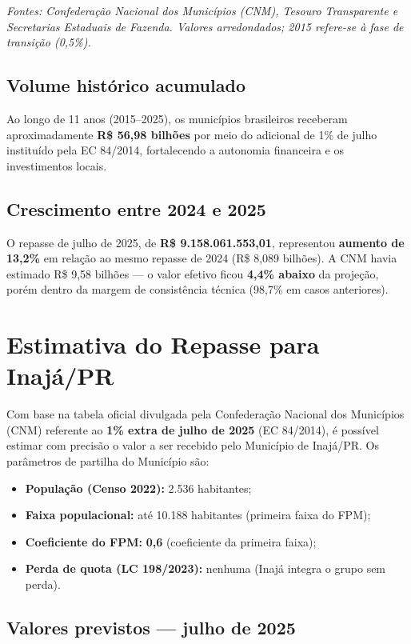 \documentclass[12pt,a4paper]{article}
\begin{document}
\smallskip
\textit{Fontes: Confederação Nacional dos Municípios (CNM), Tesouro Transparente e Secretarias Estaduais de Fazenda. Valores arredondados; 2015 refere-se à fase de transição (0,5\%).}

\subsection{Volume histórico acumulado}

Ao longo de 11 anos (2015--2025), os municípios brasileiros receberam aproximadamente \textbf{R\$ 56,98 bilhões} por meio do adicional de 1\% de julho instituído pela EC 84/2014, fortalecendo a autonomia financeira e os investimentos locais.

\subsection{Crescimento entre 2024 e 2025}

O repasse de julho de 2025, de \textbf{R\$ 9.158.061.553,01}, representou \textbf{aumento de 13,2\%} em relação ao mesmo repasse de 2024 (R\$ 8,089 bilhões). A CNM havia estimado R\$ 9,58 bilhões --- o valor efetivo ficou \textbf{4,4\% abaixo} da projeção, porém dentro da margem de consistência técnica (98,7\% em casos anteriores).

\section{Estimativa do Repasse para Inajá/PR}

Com base na tabela oficial divulgada pela Confederação Nacional dos Municípios (CNM) referente ao \textbf{1\% extra de julho de 2025} (EC 84/2014), é possível estimar com precisão o valor a ser recebido pelo Município de Inajá/PR. Os parâmetros de partilha do Município são:

\begin{itemize}[leftmargin=2.5em]
  \item \textbf{População (Censo 2022):} 2.536 habitantes;
  \item \textbf{Faixa populacional:} até 10.188 habitantes (primeira faixa do FPM);
  \item \textbf{Coeficiente do FPM:} \textbf{0,6} (coeficiente da primeira faixa);
  \item \textbf{Perda de quota (LC 198/2023):} nenhuma (Inajá integra o grupo sem perda).
\end{itemize}

\subsection{Valores previstos --- julho de 2025}
\end{document}

